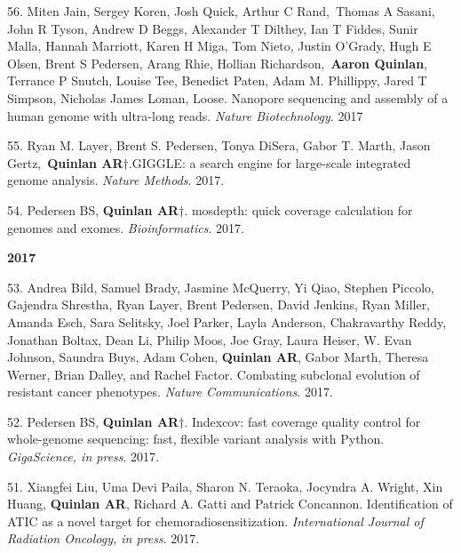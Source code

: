 \documentclass[margin,line]{cv}
\begin{document}
\begin{resume}
\begin{list}{*}{}
    \item[56.] Miten Jain, Sergey Koren, Josh Quick, Arthur C Rand, Thomas A Sasani, John R Tyson, Andrew D Beggs, Alexander T Dilthey, Ian T Fiddes, Sunir Malla, Hannah Marriott, Karen H Miga, Tom Nieto, Justin O'Grady, Hugh E Olsen, Brent S Pedersen, Arang Rhie, Hollian Richardson, \textbf{Aaron Quinlan}, Terrance P Snutch, Louise Tee, Benedict Paten, Adam M. Phillippy, Jared T Simpson, Nicholas James Loman, Loose. 
    Nanopore sequencing and assembly of a human genome with ultra-long reads. \emph{Nature Biotechnology}. 2017

    \item[55.] Ryan M. Layer, Brent S. Pedersen, Tonya DiSera, Gabor T. Marth, Jason Gertz, \textbf{Quinlan AR}$\dagger$.GIGGLE: a search engine for large-scale integrated genome analysis. \emph{Nature Methods}. 2017.

    \item[54.] Pedersen BS, \textbf{Quinlan AR}$\dagger$.
    mosdepth: quick coverage calculation for genomes and exomes. \emph{Bioinformatics}. 2017. 

    \end{list}
 

    \textbf{2017} \\

    \begin{list}{*}{}

    \item[53.] Andrea Bild, Samuel Brady, Jasmine McQuerry, Yi Qiao, Stephen Piccolo, Gajendra Shrestha, Ryan Layer, Brent Pedersen, David Jenkins, Ryan Miller, Amanda Esch, Sara Selitsky, Joel Parker, Layla Anderson, Chakravarthy Reddy, Jonathan Boltax, Dean Li, Philip Moos, Joe Gray, Laura Heiser, W. Evan Johnson, Saundra Buys, Adam Cohen,  \textbf{Quinlan AR}, Gabor Marth, Theresa Werner, Brian Dalley, and Rachel Factor.
    Combating subclonal evolution of resistant cancer phenotypes. \emph{Nature Communications}. 2017.

    \item[52.] Pedersen BS, \textbf{Quinlan AR}$\dagger$.
    Indexcov: fast coverage quality control for whole-genome sequencing: fast, flexible variant analysis with Python. \emph{GigaScience, in press}. 2017. 

    \item[51.] Xiangfei Liu, Uma Devi Paila, Sharon N. Teraoka, Jocyndra A. Wright, Xin Huang, \textbf{Quinlan AR}, Richard A. Gatti and Patrick Concannon.
    Identification of ATIC as a novel target for chemoradiosensitization. \emph{International Journal of Radiation Oncology, in press}. 2017.


\end{list}
\end{resume}
\end{document}
